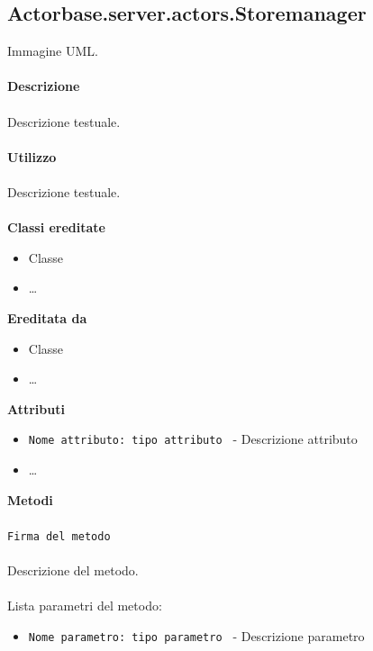 \documentclass[a4paper]{article}
\begin{document}
	\subsection{Actorbase.server.actors.Storemanager}
		Immagine UML.
		\\ \\
		\textbf{Descrizione}
			\\ \\
			Descrizione testuale.
			\\ \\
		\textbf{Utilizzo}
			\\ \\
			Descrizione testuale.
			\\ \\
		\textbf{Classi ereditate}
			\begin{itemize}
				\item Classe
				\item \dots
			\end{itemize}
		\textbf{Ereditata da}
			\begin{itemize}
				\item Classe
				\item \dots
			\end{itemize}
		\textbf{Attributi}
			\begin{itemize}
				\item \texttt{Nome attributo: tipo attributo } - Descrizione attributo
				\item \dots
			\end{itemize}
		\textbf{Metodi}
			\\ \\
			\texttt{Firma del metodo}
			\\ \\
			Descrizione del metodo.
			\\ \\
			Lista parametri del metodo:
			\begin{itemize}
				\item \texttt{Nome parametro: tipo parametro } - Descrizione parametro
			\end{itemize}
		
\end{document}
